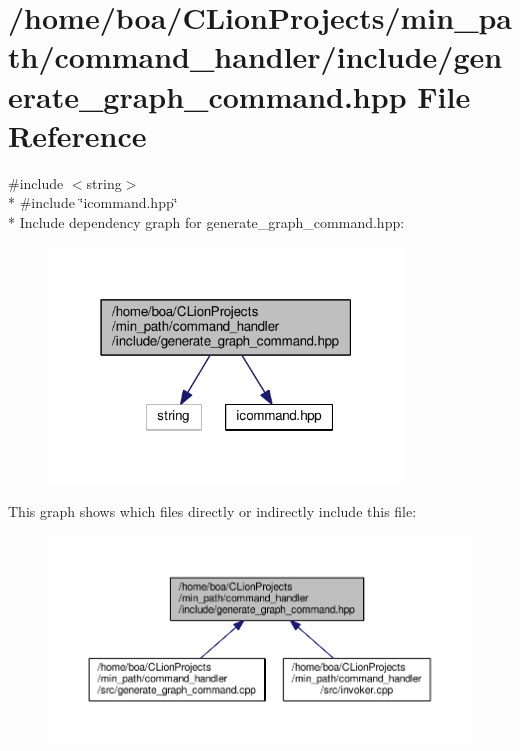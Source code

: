 \hypertarget{a00019}{}\section{/home/boa/\+C\+Lion\+Projects/min\+\_\+path/command\+\_\+handler/include/generate\+\_\+graph\+\_\+command.hpp File Reference}
\label{a00019}
{\ttfamily \#include $<$string$>$}\\*
{\ttfamily \#include \char`\"{}icommand.\+hpp\char`\"{}}\\*
Include dependency graph for generate\+\_\+graph\+\_\+command.\+hpp\+:
\nopagebreak
\begin{figure}[H]
\begin{center}
\leavevmode
\includegraphics[width=267pt]{d3/dea/a00046}
\end{center}
\end{figure}
This graph shows which files directly or indirectly include this file\+:
\nopagebreak
\begin{figure}[H]
\begin{center}
\leavevmode
\includegraphics[width=350pt]{d6/d2d/a00047}
\end{center}
\end{figure}
